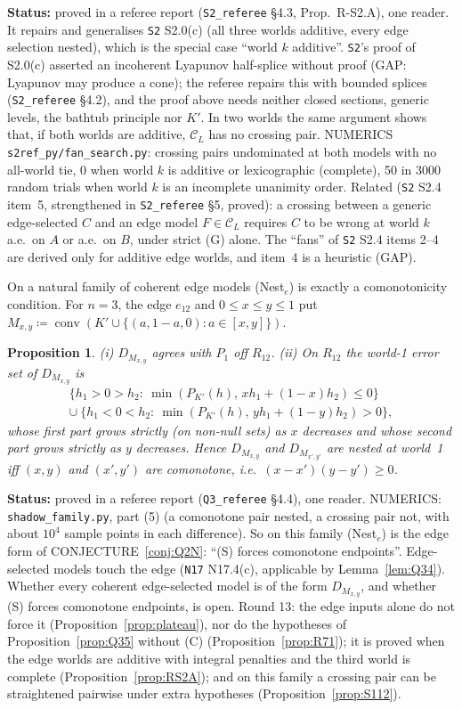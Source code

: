\documentclass[11pt]{article}
\newtheorem{proposition}[theorem]{Proposition}
\theoremstyle{definition}
\theoremstyle{remark}
\newcommand{\C}{\mathcal C}
\newcommand{\co}{\operatorname{conv}}
\newcommand{\src}[1]{\texttt{#1}}
\newcommand{\status}[1]{\par\smallskip\noindent\textbf{Status:} #1\par\smallskip}
\begin{document}
\status{proved in a referee report (\src{S2\_referee} \S4.3, Prop.~R-S2.A), one reader. It repairs and generalises \src{S2} S2.0(c) (all three worlds additive, every edge selection nested), which is the special case ``world $k$ additive''. \src{S2}'s proof of S2.0(c) asserted an incoherent Lyapunov half-splice without proof (GAP: Lyapunov may produce a cone); the referee repairs this with bounded splices (\src{S2\_referee} \S4.2), and the proof above needs neither closed sections, generic levels, the bathtub principle nor $K'$. In two worlds the same argument shows that, if both worlds are additive, $\C_L$ has no crossing pair. NUMERICS \src{s2ref\_py/fan\_search.py}: crossing pairs undominated at both models with no all-world tie, 0 when world $k$ is additive or lexicographic (complete), 50 in 3000 random trials when world $k$ is an incomplete unanimity order. Related (\src{S2} S2.4 item~5, strengthened in \src{S2\_referee} \S5, proved): a crossing between a generic edge-selected $C$ and an edge model $F\in\C_L$ requires $C$ to be wrong at world $k$ a.e.\ on $A$ or a.e.\ on $B$, under strict (G) alone. The ``fans'' of \src{S2} S2.4 items 2--4 are derived only for additive edge worlds, and item~4 is a heuristic (GAP).}

On a natural family of coherent edge models (Nest$_e$) is exactly a comonotonicity condition. For $n=3$, the edge $e_{12}$ and $0\le x\le y\le1$ put $M_{x,y}\coloneqq\co(K'\cup\{(a,1-a,0):a\in[x,y]\})$.

\begin{proposition}\label{prop:comonotone}
(i) $D_{M_{x,y}}$ agrees with $P_1$ off $R_{12}$. (ii) On $R_{12}$ the world-1 error set of $D_{M_{x,y}}$ is
\begin{multline*}
\{h_1>0>h_2:\ \min(P_{K'}(h),\,xh_1+(1-x)h_2)\le0\}\\
\cup\ \{h_1<0<h_2:\ \min(P_{K'}(h),\,yh_1+(1-y)h_2)>0\},
\end{multline*}
whose first part grows strictly (on non-null sets) as $x$ decreases and whose second part grows strictly as $y$ decreases. Hence $D_{M_{x,y}}$ and $D_{M_{x',y'}}$ are nested at world~1 iff $(x,y)$ and $(x',y')$ are comonotone, i.e.\ $(x-x')(y-y')\ge0$.
\end{proposition}
\status{proved in a referee report (\src{Q3\_referee} \S4.4), one reader. NUMERICS: \src{shadow\_family.py}, part (5) (a comonotone pair nested, a crossing pair not, with about $10^4$ sample points in each difference). So on this family (Nest$_e$) is the edge form of CONJECTURE~\ref{conj:Q2N}: ``(S) forces comonotone endpoints''. Edge-selected models touch the edge (\src{N17} N17.4(c), applicable by Lemma~\ref{lem:Q34}). Whether every coherent edge-selected model is of the form $D_{M_{x,y}}$, and whether (S) forces comonotone endpoints, is open. Round 13: the edge inputs alone do not force it (Proposition~\ref{prop:plateau}), nor do the hypotheses of Proposition~\ref{prop:Q35} without (C) (Proposition~\ref{prop:R71}); it is proved when the edge worlds are additive with integral penalties and the third world is complete (Proposition~\ref{prop:RS2A}); and on this family a crossing pair can be straightened pairwise under extra hypotheses (Proposition~\ref{prop:S112}).}
\end{document}
